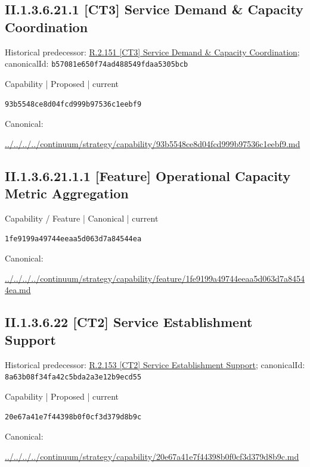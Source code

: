 \documentclass[10pt,a4paper]{article}
\begin{document}
\subsection*{II.1.3.6.21.1 [CT3] Service Demand \& Capacity Coordination}
Historical predecessor: \hyperref[element-b57081e650f74ad488549fdaa5305bcb]{R.2.151 [CT3] Service Demand \& Capacity Coordination}; canonicalId: \texttt{b57081e650f74ad488549fdaa5305bcb}\par
\label{element-93b5548ce8d04fcd999b97536c1eebf9}
{\small Capability | Proposed | current}\par
\texttt{93b5548ce8d04fcd999b97536c1eebf9}\par
Canonical: \par
{\footnotesize\url{../../../../continuum/strategy/capability/93b5548ce8d04fcd999b97536c1eebf9.md}}\par
\subsection*{II.1.3.6.21.1.1 [Feature] Operational Capacity Metric Aggregation}
\label{element-1fe9199a49744eeaa5d063d7a84544ea}
{\small Capability / Feature | Canonical | current}\par
\texttt{1fe9199a49744eeaa5d063d7a84544ea}\par
Canonical: \par
{\footnotesize\url{../../../../continuum/strategy/capability/feature/1fe9199a49744eeaa5d063d7a84544ea.md}}\par
\subsection*{II.1.3.6.22 [CT2] Service Establishment Support}
Historical predecessor: \hyperref[element-8a63b08f34fa42c5bda2a3e12b9ecd55]{R.2.153 [CT2] Service Establishment Support}; canonicalId: \texttt{8a63b08f34fa42c5bda2a3e12b9ecd55}\par
\label{element-20e67a41e7f44398b0f0cf3d379d8b9c}
{\small Capability | Proposed | current}\par
\texttt{20e67a41e7f44398b0f0cf3d379d8b9c}\par
Canonical: \par
{\footnotesize\url{../../../../continuum/strategy/capability/20e67a41e7f44398b0f0cf3d379d8b9c.md}}\par
\end{document}
